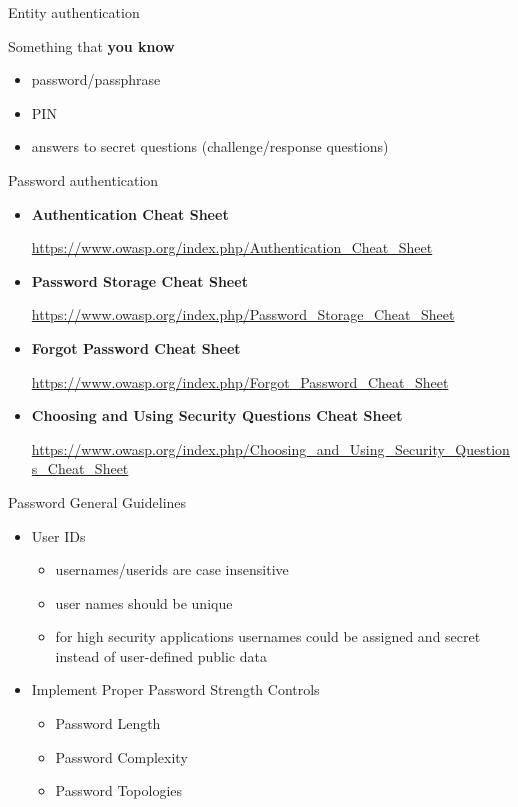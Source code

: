 \documentclass[pdf]{beamer}
\begin{document}
\begin{frame}{Entity authentication}

Something that \textbf{you know}

\begin{itemize}
\item
password/passphrase
\item
PIN
\item
answers to secret questions (challenge/response questions)
\end{itemize}
\end{frame}



\begin{frame}{Password authentication}
\begin{itemize}
\item
\textbf{Authentication Cheat Sheet}

\url{https://www.owasp.org/index.php/Authentication_Cheat_Sheet}

\item
\textbf{Password Storage Cheat Sheet}

\url{https://www.owasp.org/index.php/Password_Storage_Cheat_Sheet}

\item
\textbf{Forgot Password Cheat Sheet}

\url{https://www.owasp.org/index.php/Forgot_Password_Cheat_Sheet}

\item
\textbf{Choosing and Using Security Questions Cheat Sheet}

\url{https://www.owasp.org/index.php/Choosing_and_Using_Security_Questions_Cheat_Sheet}

\end{itemize}
\end{frame}



\begin{frame}{Password General Guidelines}
\begin{itemize}
\item
User IDs
\begin{itemize}
\item
usernames/userids are case insensitive
\item
user names should be unique
\item
for high security applications usernames could be assigned and secret instead of user-defined public data
\end{itemize}

\item
Implement Proper Password Strength Controls
\begin{itemize}
\item
Password Length
\item
Password Complexity
\item
Password Topologies
\end{itemize}
\end{itemize}
\end{frame}
\end{document}
